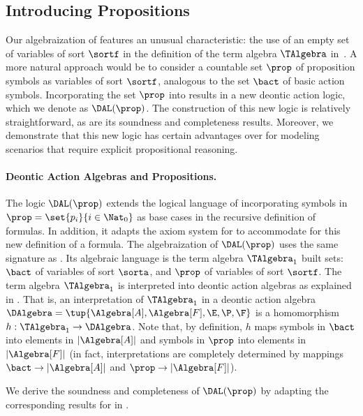 \subsection{Introducing Propositions}\label{sec:dal:propositions}

Our algebraization of \DAL features an unusual characteristic: the use of an empty set of variables of sort $\sortf$ in the definition of the term algebra $\TAlgebra$ in~.
A more natural approach would be to consider a countable set $\prop$ of proposition symbols as variables of sort $\sortf$, analogous to the set $\bact$ of basic action symbols.
Incorporating the set $\prop$ into \DAL results in a new deontic action logic, which we denote as $\DAL(\prop)$.
The construction of this new logic is relatively straightforward, as are its soundness and completeness results.
Moreover, we demonstrate that this new logic has certain advantages over \DAL for modeling scenarios that require explicit propositional reasoning.

\paragraph{Deontic Action Algebras and Propositions.}

The logic $\DAL(\prop)$ extends the logical language of \DAL incorporating symbols in $\prop = \set{p_i}{i \in \Nat_0}$ as base cases in the recursive definition of formulas.
In addition, it adapts the axiom system for \DAL to accommodate for this new definition of a formula.
The algebraization of $\DAL(\prop)$ uses the same signature as \DAL.
Its algebraic language is the term algebra $\TAlgebra_1$ built sets:
	$\bact$ of variables of sort $\sorta$, and
	$\prop$ of variables of sort $\sortf$.
The term algebra $\TAlgebra_1$ is interpreted into deontic action algebras as explained in . That is, an interpretation of $\TAlgebra_1$ in a deontic action algebra 
$\DAlgebra = \tup{\Algebra[A], \Algebra[F], \E, \P, \F}$ is a homomorphism $h:\TAlgebra_1 \to \DAlgebra$. Note that, by definition, $h$ maps symbols in $\bact$ into elements in $|\Algebra[A]|$ and symbols in $\prop$ into elements in $|\Algebra[F]|$ (in fact, interpretations are completely determined by mappings $\bact \to |\Algebra[A]|$ and $\prop \to |\Algebra[F]|$).

We derive the soundness and completeness of $\DAL(\prop)$ by adapting the corresponding results for \DAL in .

